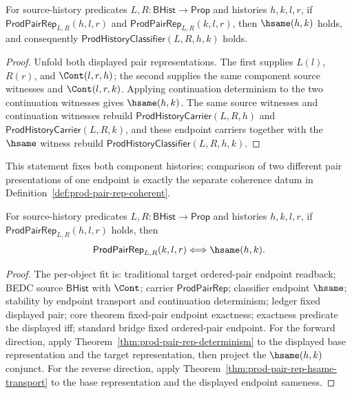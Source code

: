 \begin{theorem}
\label{thm:prod-pair-rep-determinism}
For source-history predicates $L,R:\mathsf{BHist}\to\mathsf{Prop}$ and histories $h,k,l,r$,
if $\mathsf{ProdPairRep}_{L,R}(h,l,r)$ and
$\mathsf{ProdPairRep}_{L,R}(k,l,r)$, then
$\hsame(h,k)$ holds, and consequently
$\mathsf{ProdHistoryClassifier}(L,R,h,k)$ holds.
\end{theorem}
\begin{proof}
Unfold both displayed pair representations. The first supplies $L(l)$, $R(r)$,
and $\Cont(l,r,h)$; the second supplies the same component source witnesses and
$\Cont(l,r,k)$. Applying continuation determinism to the two continuation
witnesses gives $\hsame(h,k)$. The same source witnesses and continuation
witnesses rebuild $\mathsf{ProdHistoryCarrier}(L,R,h)$ and
$\mathsf{ProdHistoryCarrier}(L,R,k)$, and these endpoint carriers together with
the $\hsame$ witness rebuild
$\mathsf{ProdHistoryClassifier}(L,R,h,k)$.
\end{proof}
This statement fixes both component histories; comparison of two different pair presentations of one endpoint is exactly the separate coherence datum in Definition~\ref{def:prod-pair-rep-coherent}.

\begin{theorem}
\label{thm:prod-pair-rep-fixed-endpoint-exactness}
For source-history predicates $L,R:\mathsf{BHist}\to\mathsf{Prop}$ and histories
$h,k,l,r$, if $\mathsf{ProdPairRep}_{L,R}(h,l,r)$ holds, then
$$
  \mathsf{ProdPairRep}_{L,R}(k,l,r)\Longleftrightarrow\hsame(h,k).
$$
\end{theorem}
\begin{proof}
The per-object fit is: traditional target ordered-pair endpoint readback; BEDC
source $\mathsf{BHist}$ with $\Cont$; carrier $\mathsf{ProdPairRep}$;
classifier endpoint $\hsame$; stability by endpoint transport and continuation
determinism; ledger fixed displayed pair; core theorem fixed-pair endpoint
exactness; exactness predicate the displayed iff; standard bridge fixed
ordered-pair endpoint. For the forward direction, apply
Theorem~\ref{thm:prod-pair-rep-determinism} to the displayed
base representation and the target representation, then project the
$\hsame(h,k)$ conjunct. For the reverse direction, apply
Theorem~\ref{thm:prod-pair-rep-hsame-transport} to the base representation and
the displayed endpoint sameness.
\end{proof}

